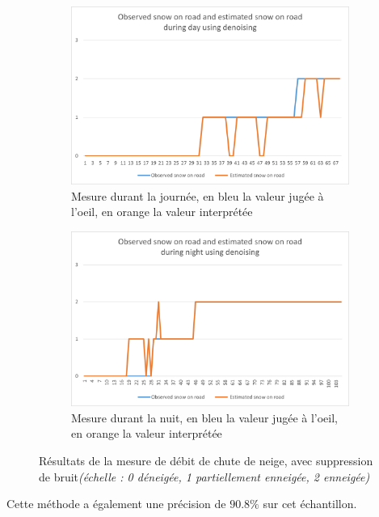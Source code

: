 \begin{figure}[H]
\begin{subfigure}{.45\textwidth}
        \includegraphics[width=\linewidth]{Images/computer_vision/snowOnRoad/dayResults_noNoise.png}
        \caption{Mesure durant la journée, en bleu la valeur jugée à l'oeil, en orange la valeur interprétée}
        \label{fig:SnowOnRoad_noNoise_dayResults}
    \end{subfigure}
    \hfill
    \begin{subfigure}{.45\textwidth}
        \includegraphics[width=\linewidth]{Images/computer_vision/snowOnRoad/nightResults_noNoise.png}
        \caption{Mesure durant la nuit, en bleu la valeur jugée à l'oeil, en orange la valeur interprétée}
        \label{fig:SnowOnRoad_noNoise_nightResults}
    \end{subfigure}
    \caption{Résultats de la mesure de débit de chute de neige, avec suppression de bruit\emph{(échelle : 0 déneigée, 1 partiellement enneigée, 2 enneigée)}}
    \label{fig:SnowOnRoad_noNoise_results}
\end{figure}
Cette méthode a également une précision de $90.8\%$ sur cet échantillon.



